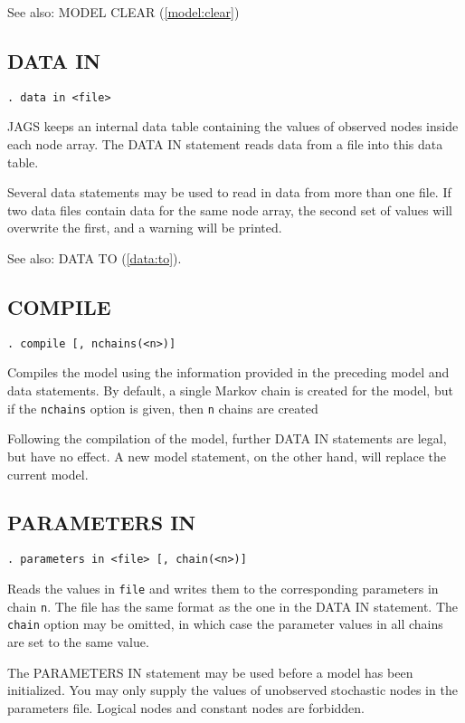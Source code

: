 \documentclass[11pt, a4paper, titlepage]{report}
\begin{document}
See also: MODEL CLEAR (\ref{model:clear})

\subsection{DATA IN}
\label{data:in}

\begin{verbatim}
. data in <file>
\end{verbatim}
JAGS keeps an internal data table containing the values of observed
nodes inside each node array.  The DATA IN statement reads data from a
file into this data table.

Several data statements may be used to read in data from more than one
file. If two data files contain data for the same node array, the second
set of values will overwrite the first, and a warning will be printed.

See also: DATA TO (\ref{data:to}).

\subsection{COMPILE}

\begin{verbatim}
. compile [, nchains(<n>)]
\end{verbatim}
Compiles the model using the information provided in the preceding
model and data statements. By default, a single Markov chain is
created for the model, but if the \texttt{nchains} option is given,
then \texttt{n} chains are created 

Following the compilation of the model, further DATA IN statements are
legal, but have no effect.  A new model statement, on the other hand,
will replace the current model.

\subsection{PARAMETERS IN}
\label{parameters:in}

\begin{verbatim}
. parameters in <file> [, chain(<n>)]
\end{verbatim}
Reads the values in \texttt{file} and writes them to the corresponding
parameters in chain \texttt{n}. The file has the same format as the
one in the DATA IN statement.  The \texttt{chain} option may be
omitted, in which case the parameter values in all chains are set to
the same value.

The PARAMETERS IN statement may be used before a model has been
initialized.  You may only supply the values of unobserved stochastic
nodes in the parameters file. Logical nodes and constant nodes are
forbidden.
\end{document}
